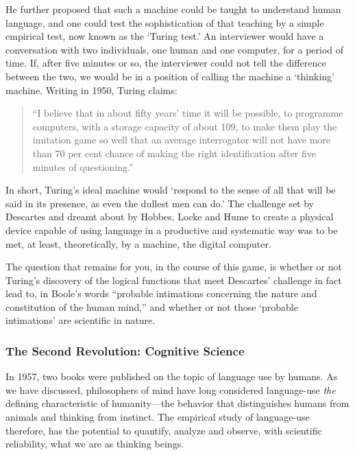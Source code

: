 He further proposed that such a machine could be taught to understand human language, and one could test the sophistication of that teaching by a simple empirical test, now known as the `Turing test.' An interviewer would have a conversation with two individuals, one human and one computer, for a period of time. If, after five minutes or so, the interviewer could not tell the difference between the two, we would be in a position of calling the machine a `thinking' machine. Writing in 1950, Turing claims:

\begin{quote}

“I believe that in about fifty years' time it will be possible, to programme computers, with a storage capacity of about 109, to make them play the imitation game so well that an average interrogator will not have more than 70 per cent chance of making the right identification after five minutes of questioning.”
\end{quote}

In short, Turing's ideal machine would `respond to the sense of all that will be said in its presence, as even the dullest men can do.' The challenge set by Descartes and dreamt about by Hobbes, Locke and Hume to create a physical device capable of using language in a productive and systematic way was to be met, at least, theoretically, by a machine, the digital computer.

The question that remains for you, in the course of this game, is whether or not Turing's discovery of the logical functions that meet Descartes' challenge in fact lead to, in Boole's words “probable intimations concerning the nature and constitution of the human mind,” and whether or not those `probable intimations' are scientific in nature.

\subsubsection{The Second Revolution: Cognitive Science}
\label{thesecondrevolution:cognitivescience}

In 1957, two books were published on the topic of language use by humans. As we have discussed, philosophers of mind have long considered language-use \emph{the} defining characteristic of humanity---the behavior that distinguishes humans from animals and thinking from instinct. The empirical study of language-use therefore, has the potential to quantify, analyze and observe, with scientific reliability, what we are as thinking beings.

